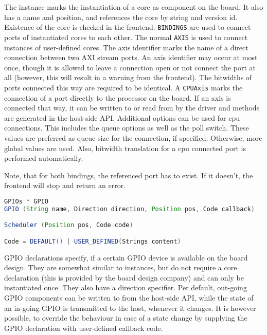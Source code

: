 \documentclass{report}
\begin{document}
The instance marks the instantiation of a core as component on the board. It also has a name and position, and references the core by string and version id. Existence of the core is checked in the frontend. \texttt{BINDINGS} are used to connect ports of instantiated cores to each other. The normal \texttt{AXIS} is used to connect instances of user-defined cores. The axis identifier marks the name of a direct connection between two AXI stream ports. An axis identifier may occur at most once, though it is allowed to leave a connection open or not connect the port at all (however, this will result in a warning from the frontend). The bitwidths of ports connected this way are required to be identical.
A \texttt{CPUAxis} marks the connection of a port directly to the processor on the board. If an axis is connected that way, it can be written to or read from by the driver and methods are generated in the host-side API. Additional options can be used for cpu connections. This includes the queue options as well as the poll switch. These values are preferred as queue size for the connection, if specified. Otherwise, more global values are used. Also, bitwidth translation for a cpu connected port is performed automatically.

Note, that for both bindings, the referenced port has to exist. If it doesn't, the frontend will stop and return an error. %

\begin{lstlisting}[language=java, breaklines=true]
GPIOs * GPIO
GPIO (String name, Direction direction, Position pos, Code callback)

Scheduler (Position pos, Code code)

Code = DEFAULT() | USER_DEFINED(Strings content)
\end{lstlisting}

GPIO declarations specify, if a certain GPIO device is available on the board design. They are somewhat similar to instances, but do not require a core declaration (this is provided by the board design company) and can only be instantiated once. They also have a direction specifier. Per default, out-going GPIO components can be written to from the host-side API, while the state of an in-going GPIO is transmitted to the host, whenever it changes. It is however possible, to override the behaviour in case of a state change by supplying the GPIO declaration with user-defined callback code. %
\end{document}
